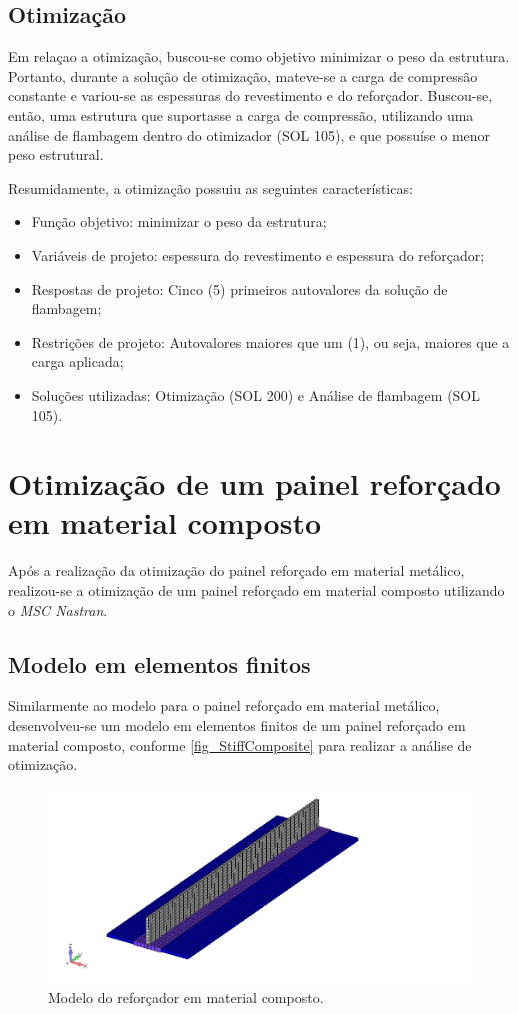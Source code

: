 {\subsection{Otimização}
Em relaçao a otimização, buscou-se como objetivo minimizar o peso da estrutura. Portanto, durante a solução de otimização, mateve-se a carga de compressão constante e variou-se as espessuras do revestimento e do reforçador. Buscou-se, então, uma estrutura que suportasse a carga de compressão, utilizando uma análise de flambagem dentro do otimizador (SOL 105), e que possuíse o menor peso estrutural.

Resumidamente, a otimização possuiu as seguintes características:
\begin{itemize}
\item Função objetivo: minimizar o peso da estrutura;
\item Variáveis de projeto: espessura do revestimento e espessura do reforçador;
\item Respostas de projeto: Cinco (5) primeiros autovalores da solução de flambagem;
\item Restrições de projeto: Autovalores maiores que um (1), ou seja, maiores que a carga aplicada;
\item Soluções utilizadas: Otimização (SOL 200) e Análise de flambagem (SOL 105).
\end{itemize}

\section{Otimização de um painel reforçado em material composto}
Após a realização da otimização do painel reforçado em material metálico, realizou-se a otimização de um painel reforçado em material composto utilizando o \emph{MSC Nastran}.

\subsection{Modelo em elementos finitos}
Similarmente ao modelo para o painel reforçado em material metálico, desenvolveu-se um modelo em elementos finitos de um painel reforçado em material composto, conforme \autoref{fig_StiffComposite} para realizar a análise de otimização.

\begin{figure}[ht]
 \caption{\label{fig_StiffComposite}Modelo do reforçador em material composto.}
 \centering
 \includegraphics[scale=0.7]{figura/StiffComposite}
\end{figure}
\

}
